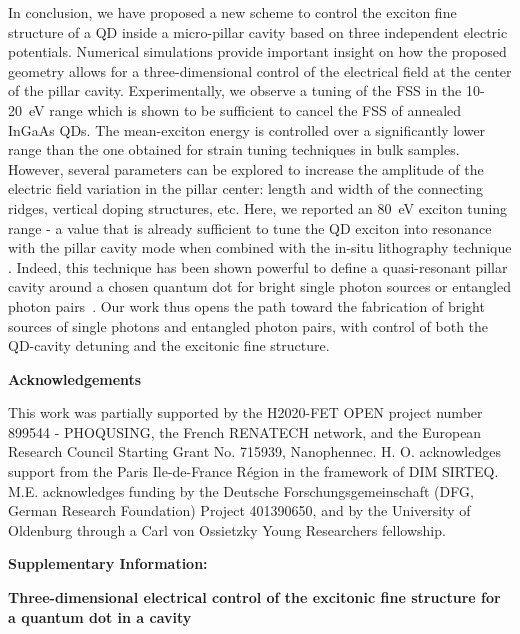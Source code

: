 \documentclass[article,twocolumn, superscriptaddress, 10pt, nofootinbib]{revtex4-1}%
\begin{document}
In conclusion, we have proposed a new scheme  to control the exciton fine structure of a QD inside a micro-pillar cavity based on three independent electric potentials. 
Numerical simulations provide important insight on how the proposed geometry allows for a three-dimensional control of the electrical field at the center of the pillar cavity. Experimentally, we observe a tuning  of  the FSS in the 10-20~\textmu eV range   \cite{trotta2014,trotta_energy-tunable_2015} which is shown to be sufficient  to cancel the FSS of annealed InGaAs QDs. {The  mean-exciton energy is controlled over a   significantly lower range than the one obtained for strain tuning techniques in bulk samples. 
However,  several parameters  can be explored to increase the amplitude of the electric field variation in the pillar center: length and width of the connecting ridges, vertical doping structures, etc. Here, we reported an 80~\textmu eV exciton tuning range - a value that is already} sufficient to tune the QD exciton  into resonance with the pillar cavity mode when combined with the in-situ lithography technique \cite{dousse_controlled_2008}. Indeed, this technique has been shown powerful to define a quasi-resonant pillar cavity around a chosen quantum dot for bright single photon sources or entangled photon pairs~\cite{Somaschi2016,dousse_ultrabright_2010}. Our work thus opens the path toward the  fabrication of bright sources of single photons and entangled photon pairs, with control of both the QD-cavity detuning and the excitonic fine structure. 


\vspace{0.5cm}
\textbf{Acknowledgements} 

This work was partially supported by the H2020-FET OPEN project number 899544 - PHOQUSING, the French RENATECH network, and the European Research Council Starting Grant No. 715939, Nanophennec. H. O. acknowledges support from the Paris Ile-de-France Région in the framework of DIM SIRTEQ. M.E. acknowledges funding by the Deutsche Forschungsgemeinschaft (DFG, German Research Foundation) Project 401390650, and by the University of Oldenburg through a Carl von Ossietzky Young Researchers fellowship.




\clearpage
\pagebreak
\widetext
\begin{center}
\textbf{\large Supplementary Information:\linebreak}

\textbf{\large Three-dimensional electrical control of the excitonic fine structure  for a quantum dot in a  cavity}
\end{center}
\end{document}
